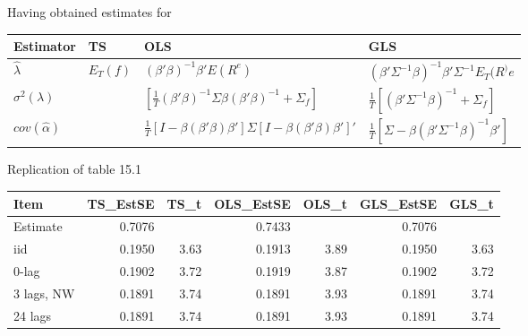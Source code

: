 \documentclass[]{article}
\begin{document}
\begin{itemize}
\begin{itemize}
	\end{itemize}
	
	Having obtained estimates for 
	
	\begin{tabular}{|l|l|l|l|}
		\hline
		Estimator & TS & OLS & GLS \\
		\hline
		$\hat{\lambda}$&$E_T(f)$&$(\beta'\beta)^{-1}\beta'E(R^e)$&$\left(\beta'\Sigma^{-1}\beta\right)^{-1}\beta'\Sigma^{-1}E_T(R^)e$\\
		$\sigma^2(\lambda)$ &  &   $\left[\frac{1}{T}(\beta'\beta)^{-1}\Sigma\beta(\beta'\beta)^{-1}+\Sigma_f\right]$  & $\frac{1}{T}\left[(\beta'\Sigma^{-1}\beta)^{-1}+\Sigma_f\right]$ \\
		$cov(\hat{\alpha})$&&$\frac{1}{T}\left[I-\beta(\beta'\beta)\beta'\right]\Sigma\left[I-\beta(\beta'\beta)\beta'\right]'$&$\frac{1}{T}\left[\Sigma-\beta(\beta'\Sigma^{-1}\beta)^{-1}\beta'\right]$\\
		\hline
	\end{tabular}


	Replication of table 15.1
	
	\begin{tabular}{l|r|r|r|r|r|r} 
		\hline
		Item & TS\_EstSE & TS\_t & OLS\_EstSE & OLS\_t & GLS\_EstSE & GLS\_t\\
		\hline
		Estimate & 0.7076 &  & 0.7433 &  & 0.7076 & \\
		\hline
		iid & 0.1950 & 3.63 & 0.1913 & 3.89 & 0.1950 & 3.63\\
		\hline
		0-lag & 0.1902 & 3.72 & 0.1919 & 3.87 & 0.1902 & 3.72\\
		\hline
		3 lags, NW & 0.1891 & 3.74 & 0.1891 & 3.93 & 0.1891 & 3.74\\
		\hline
		24 lags & 0.1891 & 3.74 & 0.1891 & 3.93 & 0.1891 & 3.74\\
		\hline
	\end{tabular}
	
\end{itemize}
\end{document}
